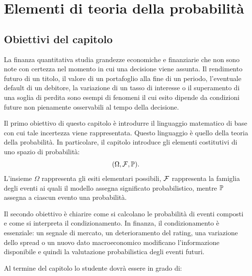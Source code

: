 

\chapter{Elementi di teoria della probabilit\`{a}}

\label{cap:probabilita}

\section{Obiettivi del capitolo}

La finanza quantitativa studia grandezze economiche e finanziarie che non sono
note con certezza nel momento in cui una decisione viene assunta. Il
rendimento futuro di un titolo, il valore di un portafoglio alla fine di un
periodo, l'eventuale default di un debitore, la variazione di un tasso di
interesse o il superamento di una soglia di perdita sono esempi di fenomeni il
cui esito dipende da condizioni future non pienamente osservabili al tempo
della decisione.

Il primo obiettivo di questo capitolo \`{e} introdurre il linguaggio
matematico di base con cui tale incertezza viene rappresentata. Questo
linguaggio \`{e} quello della teoria della probabilit\`{a}. In particolare, il
capitolo introduce gli elementi costitutivi di uno spazio di probabilit\`{a}:
\[
(\Omega,\mathcal{F},\mathbb{P}).
\]
L'insieme $\Omega$ rappresenta gli esiti elementari possibili, $\mathcal{F}$
rappresenta la famiglia degli eventi ai quali il modello assegna significato
probabilistico, mentre $\mathbb{P}$ assegna a ciascun evento una probabilit\`{a}.

Il secondo obiettivo \`{e} chiarire come si calcolano le probabilit\`{a} di
eventi composti e come si interpreta il condizionamento. In finanza, il
condizionamento \`{e} essenziale: un segnale di mercato, un deterioramento del
rating, una variazione dello spread o un nuovo dato macroeconomico modificano
l'informazione disponibile e quindi la valutazione probabilistica degli eventi futuri.

Al termine del capitolo lo studente dovr\`{a} essere in grado di:

